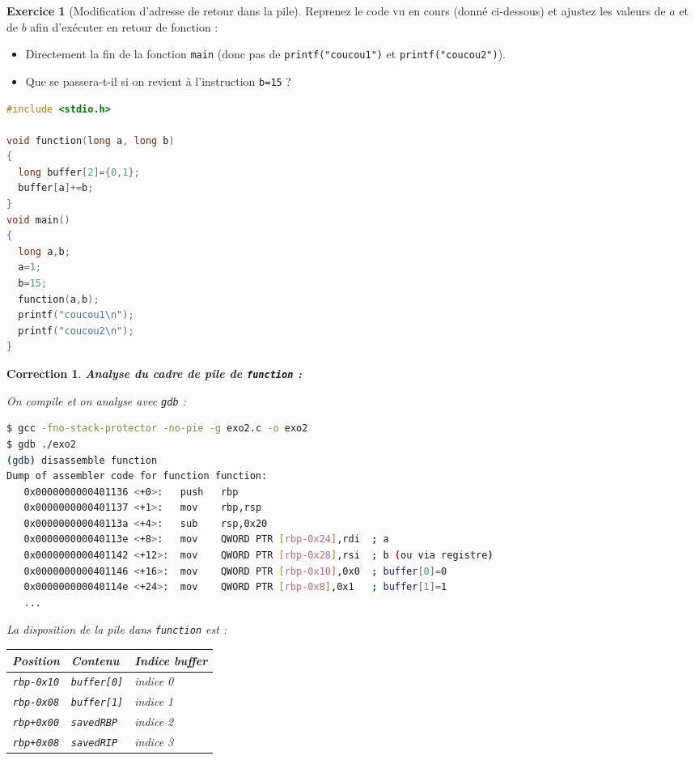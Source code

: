 \documentclass[a4paper,11pt]{article}
\theoremstyle{plain}
\newtheorem{correction}{Correction}
\theoremstyle{definition}
\newtheorem{exercice}{Exercice}
\begin{document}

\begin{exercice}[Modification d'adresse de retour dans la pile]
Reprenez le code vu en cours (donné ci-dessous) et ajustez les valeurs de $a$ et de $b$ afin d'exécuter en retour de fonction :
\begin{itemize}
\item Directement la fin de la fonction \texttt{main} (donc pas de \texttt{printf("coucou1")} et \texttt{printf("coucou2")}).
  \item Que se passera-t-il si on revient à l'instruction \texttt{b=15} ?
\end{itemize}

\begin{lstlisting}[language=C]
#include <stdio.h>

void function(long a, long b)
{
  long buffer[2]={0,1};
  buffer[a]+=b;
}
void main()
{
  long a,b;
  a=1;
  b=15;
  function(a,b);
  printf("coucou1\n");
  printf("coucou2\n");
}
\end{lstlisting}

\begin{correction}
\textbf{Analyse du cadre de pile de \texttt{function} :}

On compile et on analyse avec \texttt{gdb} :
\begin{lstlisting}[language=bash,numbers=none]
$ gcc -fno-stack-protector -no-pie -g exo2.c -o exo2
$ gdb ./exo2
(gdb) disassemble function
Dump of assembler code for function function:
   0x0000000000401136 <+0>:   push   rbp
   0x0000000000401137 <+1>:   mov    rbp,rsp
   0x000000000040113a <+4>:   sub    rsp,0x20
   0x000000000040113e <+8>:   mov    QWORD PTR [rbp-0x24],rdi  ; a
   0x0000000000401142 <+12>:  mov    QWORD PTR [rbp-0x28],rsi  ; b (ou via registre)
   0x0000000000401146 <+16>:  mov    QWORD PTR [rbp-0x10],0x0  ; buffer[0]=0
   0x000000000040114e <+24>:  mov    QWORD PTR [rbp-0x8],0x1   ; buffer[1]=1
   ...
\end{lstlisting}

La disposition de la pile dans \texttt{function} est :

\begin{center}
\begin{tabular}{|c|l|l|}
\hline
\textbf{Position} & \textbf{Contenu} & \textbf{Indice buffer} \\
\hline
\texttt{rbp-0x10} & \texttt{buffer[0]} & indice 0 \\
\texttt{rbp-0x08} & \texttt{buffer[1]} & indice 1 \\
\texttt{rbp+0x00} & \texttt{savedRBP} & indice 2 \\
\texttt{rbp+0x08} & \texttt{savedRIP} & indice 3 \\
\hline
\end{tabular}
\end{center}


\end{correction}
\end{exercice}
\end{document}
